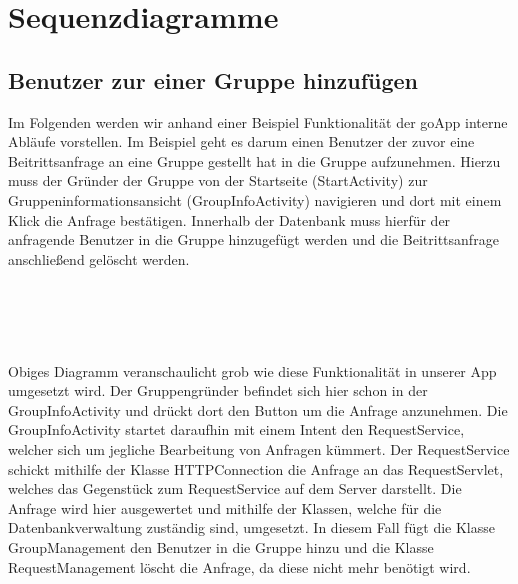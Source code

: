 \section{Sequenzdiagramme}

\subsection{Benutzer zur einer Gruppe hinzufügen}
Im Folgenden werden wir anhand einer Beispiel Funktionalität der goApp interne Abläufe vorstellen.
Im Beispiel geht es darum einen Benutzer der zuvor eine Beitrittsanfrage an eine Gruppe gestellt hat in die Gruppe aufzunehmen.
Hierzu muss der Gründer der Gruppe von der Startseite (StartActivity) zur Gruppeninformationsansicht (GroupInfoActivity) navigieren und dort mit einem Klick die Anfrage bestätigen.
Innerhalb der Datenbank muss hierfür der anfragende Benutzer in die Gruppe hinzugefügt werden und die Beitrittsanfrage anschließend gelöscht werden.
\ \\
\ \\
\ \\
\begin {center}
\end {center}
\ \\
\ \\
Obiges Diagramm veranschaulicht grob wie diese Funktionalität in unserer App umgesetzt wird.
Der Gruppengründer befindet sich hier schon in der GroupInfoActivity und drückt dort den Button um die Anfrage anzunehmen.
Die GroupInfoActivity startet daraufhin mit einem Intent den RequestService, welcher sich um jegliche Bearbeitung von Anfragen kümmert.
Der RequestService schickt mithilfe der Klasse HTTPConnection die Anfrage an das RequestServlet, welches das Gegenstück zum RequestService auf dem Server darstellt.
Die Anfrage wird hier ausgewertet und mithilfe der Klassen, welche für die Datenbankverwaltung zuständig sind, umgesetzt. In diesem Fall fügt die Klasse GroupManagement den Benutzer in die Gruppe hinzu und die Klasse RequestManagement löscht die Anfrage, da diese nicht mehr benötigt wird.
